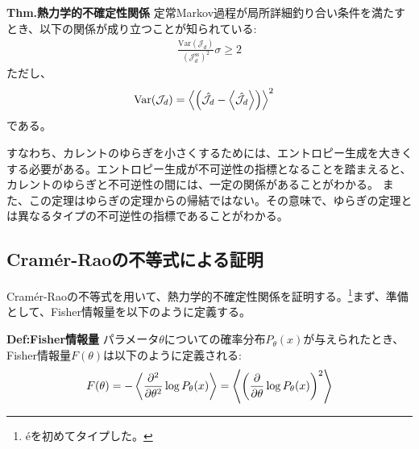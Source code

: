 \documentclass[a4paper,11pt]{jsarticle}
\numberwithin{equation}{section}
\begin{document}
\begin{itembox}[l]{\textbf{Thm.熱力学的不確定性関係}}
    定常Markov過程が局所詳細釣り合い条件を満たすとき、以下の関係が成り立つことが知られている:
    \begin{align}
        \frac{\text{Var}(\mathcal{J}_d)}{(\mathcal{J}_d^{\text{ss}})^2} \sigma \geq 2
    \end{align}
    ただし、
    \begin{align}
        \text{Var}(\mathcal{J}_d) &= \ev{\qty(\hat{\mathcal{J}}_d -\ev{\hat{\mathcal{J}_d}})}^2
    \end{align}
    である。
\end{itembox}
すなわち、カレントのゆらぎを小さくするためには、エントロピー生成を大きくする必要がある。エントロピー生成が不可逆性の指標となることを踏まえると、カレントのゆらぎと不可逆性の間には、一定の関係があることがわかる。
また、この定理はゆらぎの定理からの帰結ではない。その意味で、ゆらぎの定理とは異なるタイプの不可逆性の指標であることがわかる。

\subsection{Cram\'er-Raoの不等式による証明}
Cram\'er-Raoの不等式を用いて、熱力学的不確定性関係を証明する。\footnote{\'eを初めてタイプした。}まず、準備として、Fisher情報量を以下のように定義する。
\begin{itembox}[l]{\textbf{Def:Fisher情報量}}
    パラメータ$\theta$についての確率分布$P_{\theta}(x)$が与えられたとき、Fisher情報量$F(\theta)$は以下のように定義される:
    \begin{align}
        F(\theta) = -\ev{\pdv[2]{\theta} \log P_{\theta}(x)} =\ev{\qty(\pdv{\theta} \log P_{\theta}(x))^2}
    \end{align}
\end{itembox}
\end{document}
